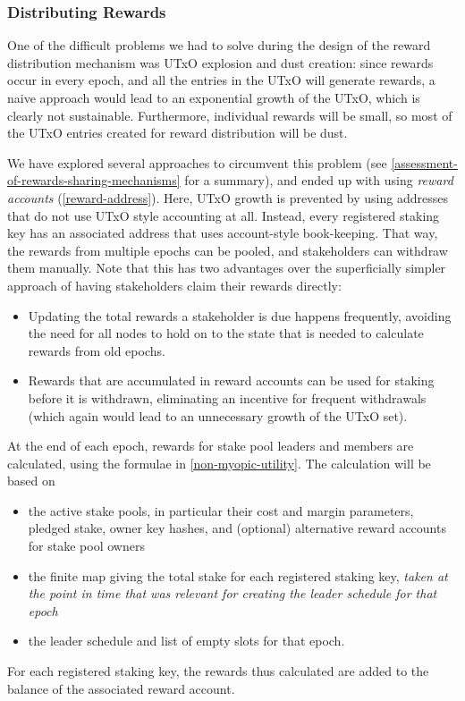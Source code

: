 \documentclass[11pt,a4paper]{article}
\begin{document}
\subsubsection{Distributing Rewards}
\label{distributing-rewards}

One of the difficult problems we had to solve during the design of the
reward distribution mechanism was UTxO explosion and dust creation:
since rewards occur in every epoch, and all the entries in the UTxO
will generate rewards, a naive approach would lead to an exponential
growth of the UTxO, which is clearly not sustainable. Furthermore,
individual rewards will be small, so most of the UTxO entries created
for reward distribution will be dust.

We have explored several approaches to circumvent this problem
(see \cref{assessment-of-rewards-sharing-mechanisms} for a summary),
and ended up with using \emph{reward accounts}
(\cref{reward-address}). Here, UTxO growth is prevented by using
addresses that do not use UTxO style accounting at all. Instead, every
registered staking key has an associated address that uses
account-style book-keeping. That way, the rewards from multiple epochs
can be pooled, and stakeholders can withdraw them manually. Note that
this has two advantages over the superficially simpler approach of
having stakeholders claim their rewards directly:
\begin{itemize}
\item Updating the total rewards a stakeholder is due happens
  frequently, avoiding the need for all nodes to hold on to the state
  that is needed to calculate rewards from old epochs.
\item Rewards that are accumulated in reward accounts can be used for
  staking before it is withdrawn, eliminating an incentive for
  frequent withdrawals (which again would lead to an unnecessary
  growth of the UTxO set).
\end{itemize}

At the end of each epoch, rewards for stake pool leaders and members
are calculated, using the formulae in \cref{non-myopic-utility}. The
calculation will be based on
\begin{itemize}
\item the active stake pools, in particular their cost and margin
  parameters, pledged stake, owner key hashes, and (optional)
  alternative reward accounts for stake pool owners
\item the finite map giving the total stake for each registered
  staking key, \emph{taken at the point in time that was relevant for
    creating the leader schedule for that epoch}
\item the leader schedule and list of empty slots for that epoch.
\end{itemize}
For each registered staking key, the rewards thus calculated are added
to the balance of the associated reward account.
\end{document}
